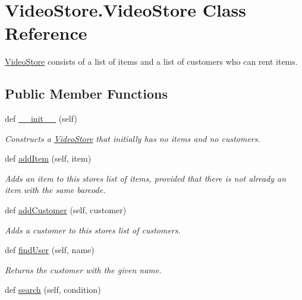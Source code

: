 \hypertarget{classVideoStore_1_1VideoStore}{}\section{Video\+Store.\+Video\+Store Class Reference}
\label{classVideoStore_1_1VideoStore}


\hyperlink{classVideoStore_1_1VideoStore}{Video\+Store} consists of a list of items and a list of customers who can rent items.  


\subsection*{Public Member Functions}
\begin{DoxyCompactItemize}
\item 
def \hyperlink{classVideoStore_1_1VideoStore_ae5c993cbfde1d6a6b872471dd8113184}{\+\_\+\+\_\+init\+\_\+\+\_\+} (self)
\begin{DoxyCompactList}\small\item\em Constructs a \hyperlink{classVideoStore_1_1VideoStore}{Video\+Store} that initially has no items and no customers. \end{DoxyCompactList}\item 
def \hyperlink{classVideoStore_1_1VideoStore_ad34e486af714a9513bff371d77b5dbbf}{add\+Item} (self, item)
\begin{DoxyCompactList}\small\item\em Adds an item to this store\textquotesingle{}s list of items, provided that there is not already an item with the same barcode. \end{DoxyCompactList}\item 
def \hyperlink{classVideoStore_1_1VideoStore_a9580d5be76ce527ceef595dc600ff92c}{add\+Customer} (self, customer)
\begin{DoxyCompactList}\small\item\em Adds a customer to this store\textquotesingle{}s list of customers. \end{DoxyCompactList}\item 
def \hyperlink{classVideoStore_1_1VideoStore_a864a5c88322cc7fe8d469963af6fbb74}{find\+User} (self, name)
\begin{DoxyCompactList}\small\item\em Returns the customer with the given name. \end{DoxyCompactList}\item 
def \hyperlink{classVideoStore_1_1VideoStore_a29c4c5fb82ee840192af398692d41cf3}{search} (self, condition)

\end{DoxyCompactItemize}
